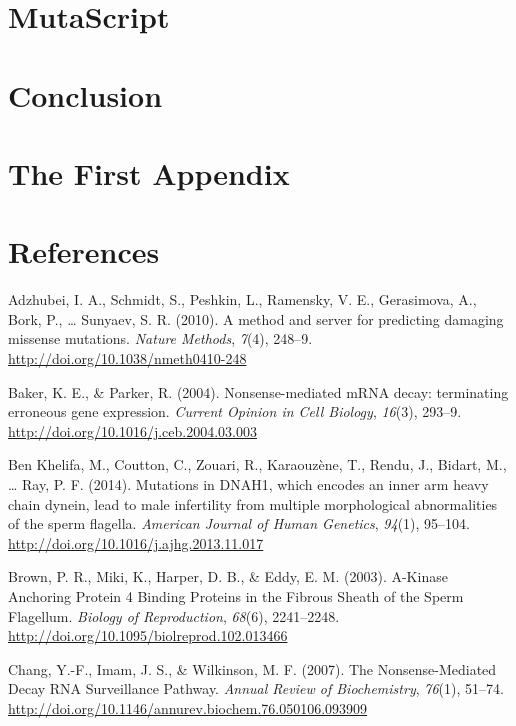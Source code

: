 \documentclass[12pt,twoside]{reedthesis}
\theoremstyle{definition}
\theoremstyle{definition}
\theoremstyle{remark}
\begin{document}
  \chapter{MutaScript}\label{mutascript}
  
  \chapter*{Conclusion}\label{conclusion-1}
  
  \chapter{The First Appendix}\label{the-first-appendix}
  
  \chapter*{References}\label{references}
  
  \hypertarget{refs}{}
  \hypertarget{ref-Adzhubei2010}{}
  Adzhubei, I. A., Schmidt, S., Peshkin, L., Ramensky, V. E., Gerasimova,
  A., Bork, P., \ldots{} Sunyaev, S. R. (2010). A method and server for
  predicting damaging missense mutations. \emph{Nature Methods},
  \emph{7}(4), 248--9. \url{http://doi.org/10.1038/nmeth0410-248}
  
  \hypertarget{ref-Baker2004}{}
  Baker, K. E., \& Parker, R. (2004). Nonsense-mediated mRNA decay:
  terminating erroneous gene expression. \emph{Current Opinion in Cell
  Biology}, \emph{16}(3), 293--9.
  \url{http://doi.org/10.1016/j.ceb.2004.03.003}
  
  \hypertarget{ref-BenKhelifa2014}{}
  Ben Khelifa, M., Coutton, C., Zouari, R., Karaouzène, T., Rendu, J.,
  Bidart, M., \ldots{} Ray, P. F. (2014). Mutations in DNAH1, which
  encodes an inner arm heavy chain dynein, lead to male infertility from
  multiple morphological abnormalities of the sperm flagella.
  \emph{American Journal of Human Genetics}, \emph{94}(1), 95--104.
  \url{http://doi.org/10.1016/j.ajhg.2013.11.017}
  
  \hypertarget{ref-Brown2003}{}
  Brown, P. R., Miki, K., Harper, D. B., \& Eddy, E. M. (2003). A-Kinase
  Anchoring Protein 4 Binding Proteins in the Fibrous Sheath of the Sperm
  Flagellum. \emph{Biology of Reproduction}, \emph{68}(6), 2241--2248.
  \url{http://doi.org/10.1095/biolreprod.102.013466}
  
  \hypertarget{ref-Chang2007}{}
  Chang, Y.-F., Imam, J. S., \& Wilkinson, M. F. (2007). The
  Nonsense-Mediated Decay RNA Surveillance Pathway. \emph{Annual Review of
  Biochemistry}, \emph{76}(1), 51--74.
  \url{http://doi.org/10.1146/annurev.biochem.76.050106.093909}
  
\end{document}
